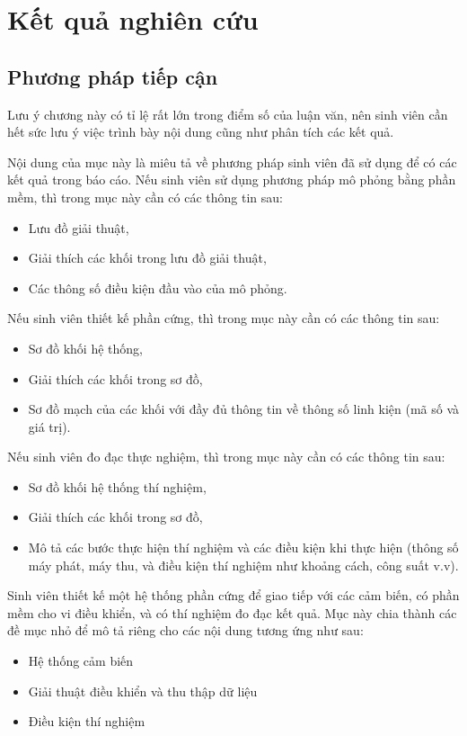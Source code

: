 \chapter{Kết quả nghiên cứu}

\section{Phương pháp tiếp cận}

Lưu ý chương này có tỉ lệ rất lớn trong điểm số của luận văn, nên sinh viên cần hết sức lưu ý việc trình bày nội dung cũng như phân tích các kết quả.

Nội dung của mục này là miêu tả về phương pháp sinh viên đã sử dụng để có các kết quả trong báo cáo.
Nếu sinh viên sử dụng phương pháp mô phỏng bằng phần mềm, thì trong mục này cần có các thông tin sau:
\begin{itemize}
\item Lưu đồ giải thuật,
\item Giải thích các khối trong lưu đồ giải thuật,
\item Các thông số điều kiện đầu vào của mô phỏng.
\end{itemize}

Nếu sinh viên thiết kế phần cứng, thì trong mục này cần có các thông tin sau:
\begin{itemize}
\item Sơ đồ khối hệ thống,
\item Giải thích các khối trong sơ đồ,
\item Sơ đồ mạch của các khối với đầy đủ thông tin về thông số linh kiện (mã số và giá trị).
\end{itemize}

Nếu sinh viên đo đạc thực nghiệm, thì trong mục này cần có các thông tin sau:
\begin{itemize}
\item Sơ đồ khối hệ thống thí nghiệm,
\item Giải thích các khối trong sơ đồ,
\item Mô tả các bước thực hiện thí nghiệm và các điều kiện khi thực hiện (thông số máy phát, máy thu, và điều kiện thí nghiệm như khoảng cách, công suất v.v).
\end{itemize}

\begin{exam}
	Sinh viên thiết kế một hệ thống phần cứng để giao tiếp với các cảm biến, có phần mềm cho vi điều khiển, và có thí nghiệm đo đạc kết quả.
	Mục này chia thành các đề mục nhỏ để mô tả riêng cho các nội dung tương ứng như sau:
	\begin{itemize}
	\item Hệ thống cảm biến
	\item Giải thuật điều khiển và thu thập dữ liệu
	\item Điều kiện thí nghiệm
	\end{itemize}
\end{exam}

